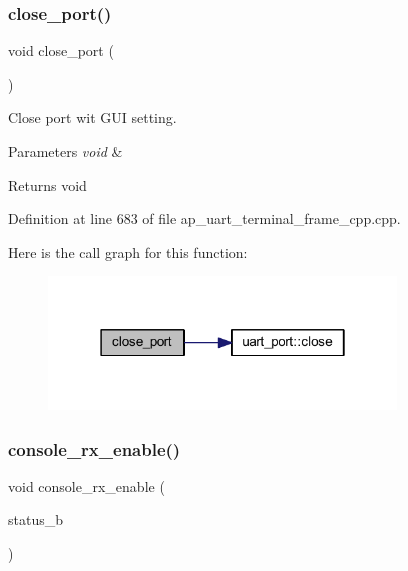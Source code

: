 \subsubsection{close\_port()}
{\footnotesize\ttfamily void close\+\_\+port (\begin{DoxyParamCaption}\item[{void}]{ }\end{DoxyParamCaption})}



Close port wit G\+UI setting. 


\begin{DoxyParams}{Parameters}
{\em void} & \\
\hline
\end{DoxyParams}
\begin{DoxyReturn}{Returns}
void 
\end{DoxyReturn}


Definition at line 683 of file ap\+\_\+uart\+\_\+terminal\+\_\+frame\+\_\+cpp.\+cpp.

Here is the call graph for this function\+:\nopagebreak
\begin{figure}[H]
\begin{center}
\leavevmode
\includegraphics[width=262pt]{group___u_a_r_t__terminal_ga39ec9a45c5fdf3b61ef3ca88973bc07c_cgraph}
\end{center}
\end{figure}
\mbox{\label{group___u_a_r_t__terminal_ga5ae97e580d2959af3a39e0bbc58bd18f}} 
\subsubsection{console\_rx\_enable()}
{\footnotesize\ttfamily void console\+\_\+rx\+\_\+enable (\begin{DoxyParamCaption}\item[{bool}]{status\+\_\+b }\end{DoxyParamCaption})}



